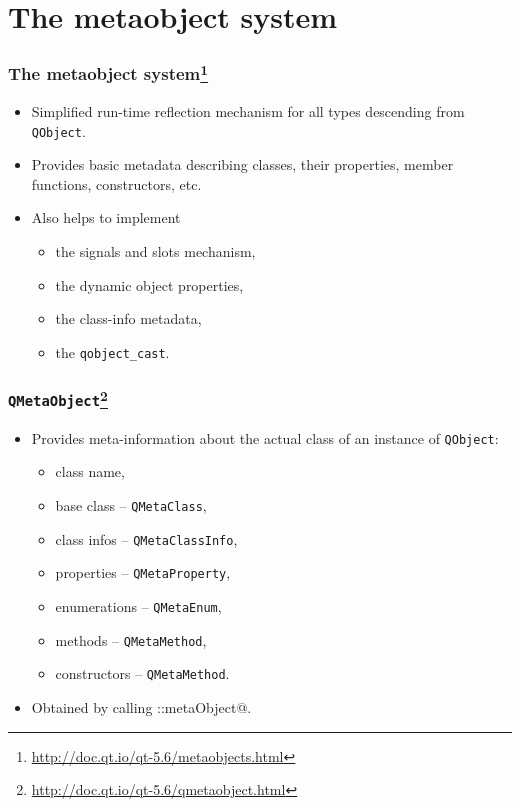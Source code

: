 \section{The metaobject system}

\begin{frame}
  \frametitle{The metaobject system\footnote
    {\url{http://doc.qt.io/qt-5.6/metaobjects.html}}}
  \begin{itemize}
    \item Simplified run-time reflection mechanism for all types descending
      from \texttt{QObject}.
    \item Provides basic metadata describing classes, their properties,
      member functions, constructors, etc.
    \item Also helps to implement
    \begin{itemize}
      \item the signals and slots mechanism,
      \item the dynamic object properties,
      \item the class-info metadata,
      \item the \texttt{qobject\_cast}.
    \end{itemize}
  \end{itemize}
\end{frame}

\begin{frame}[fragile]
  \frametitle{\texttt{QMetaObject}\footnote
    {\url{http://doc.qt.io/qt-5.6/qmetaobject.html}}}
  \begin{itemize}
    \item Provides meta-information about the actual class of an instance
      of \texttt{QObject}:
      \begin{itemize}
        \item class name,
        \item base class -- \texttt{QMetaClass},
        \item class infos -- \texttt{QMetaClassInfo},
        \item properties -- \texttt{QMetaProperty},
        \item enumerations -- \texttt{QMetaEnum},
        \item methods -- \texttt{QMetaMethod},
        \item constructors -- \texttt{QMetaMethod}.
      \end{itemize}
    \item Obtained by calling \verb@QObject::metaObject@.
  \end{itemize}
\end{frame}

